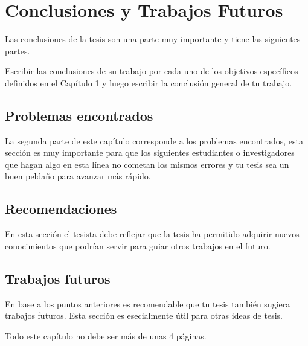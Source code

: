 \chapter{Conclusiones y Trabajos Futuros}\label{chap:conclusions}

    
Las conclusiones de la tesis son una parte muy importante y tiene las siguientes partes.

Escribir las conclusiones de su trabajo por cada uno de los objetivos específicos definidos en el Capítulo 1 y luego escribir la conclusión general de tu trabajo.

\section{Problemas encontrados}
La segunda  parte de este capítulo corresponde a los problemas encontrados, esta sección es muy importante para que los siguientes estudiantes o investigadores que hagan algo en esta línea no cometan los mismos errores y tu tesis sea un buen peldaño para avanzar más rápido.

\section{Recomendaciones}
En esta sección el tesista debe reflejar que la tesis ha permitido adquirir nuevos conocimientos que podrían servir para guiar otros trabajos en el futuro.

\section{Trabajos futuros}
En base a los puntos anteriores es recomendable que tu tesis también sugiera trabajos futuros. Esta sección es esecialmente útil para otras ideas de tesis.

Todo este capítulo no debe ser más de unas 4 páginas.